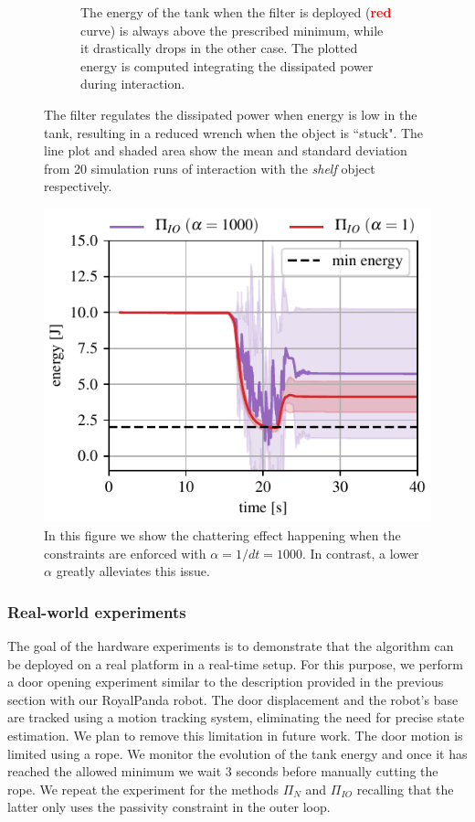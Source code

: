 \begin{figure}[t]
\begin{subfigure}{\columnwidth}
    \caption{The energy of the tank when the filter is deployed (\textcolor{red}{\textbf{red}} curve) is always above the prescribed minimum, while it drastically drops in the other case. The plotted energy is computed integrating the dissipated power during interaction.}
\end{subfigure}
\hfill
\caption{The filter regulates the dissipated power when energy is low in the tank, resulting in a reduced wrench when the object is ``stuck". The line plot and shaded area show the mean and standard deviation from 20 simulation runs of interaction with the \textit{shelf} object respectively.}\label{fig:tank_comparison}
\end{figure}

\begin{figure}[t]
\centering
\includegraphics[width=0.8\columnwidth]{figures/fix_experiment/passivity_coefficient_comparison.pdf}
\caption{In this figure we show the chattering effect happening when the constraints are enforced with $\alpha = 1/dt = 1000$. In contrast, a lower $\alpha$ greatly alleviates this issue.}\label{fig:tank_as_zbf}
\end{figure}

\vspace{0.3cm}
\subsubsection{Real-world experiments}
The goal of the hardware experiments is to demonstrate that the algorithm can be deployed on a real platform in a real-time setup. For this purpose, we perform a door opening experiment similar to the description provided in the previous section with our RoyalPanda robot. The door displacement and the robot's base are tracked using a motion tracking system, eliminating the need for precise state estimation. We plan to remove this limitation in future work. The door motion is limited using a rope. We monitor the evolution of the tank energy and once it has reached the allowed minimum we wait 3 seconds before manually cutting the rope. We repeat the experiment for the methods $\Pi_{N}$ and $\Pi_{IO}$ recalling that the latter only uses the passivity constraint in the outer loop.

